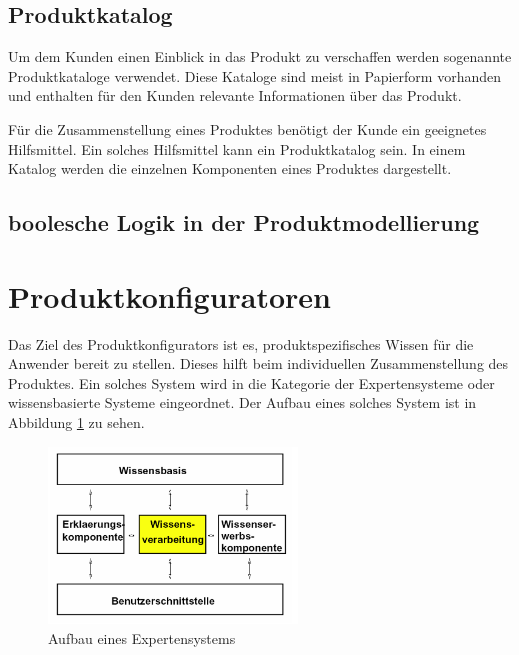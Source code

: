 \subsection{Produktkatalog}
Um dem Kunden einen Einblick in das Produkt zu verschaffen werden sogenannte Produktkataloge verwendet. Diese Kataloge sind meist in Papierform vorhanden und enthalten für den Kunden relevante Informationen über das Produkt. 

Für die Zusammenstellung eines Produktes benötigt der Kunde ein geeignetes Hilfsmittel. Ein solches Hilfsmittel kann ein Produktkatalog sein. In einem Katalog werden die einzelnen Komponenten eines Produktes dargestellt.  


\subsection{boolesche Logik in der Produktmodellierung}


\section{Produktkonfiguratoren}\label{konfiguratoren}
Das Ziel des Produktkonfigurators ist es, produktspezifisches Wissen für die Anwender bereit zu stellen. Dieses hilft beim individuellen Zusammenstellung des Produktes. Ein solches System wird in die Kategorie der Expertensysteme\cite{bib:puppe} oder wissensbasierte Systeme eingeordnet. Der Aufbau eines solches System ist in Abbildung \ref{expert_system_structure} zu sehen. \par
\begin{figure}
\centering
\includegraphics[width=250px]{images/expertensysteme}
\caption{Aufbau eines Expertensystems \cite[s.6]{bib:keller}}
\label{expert_system_structure}
\end{figure}

